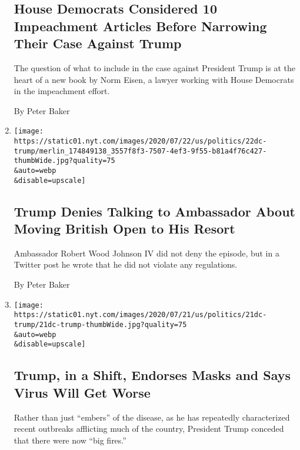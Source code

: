 \begin{enumerate}
  \hypertarget{house-democrats-considered-10-impeachment-articles-before-narrowing-their-case-against-trump}{%
  \subsection{House Democrats Considered 10 Impeachment Articles Before
  Narrowing Their Case Against
  Trump}\label{house-democrats-considered-10-impeachment-articles-before-narrowing-their-case-against-trump}}

  The question of what to include in the case against President Trump is
  at the heart of a new book by Norm Eisen, a lawyer working with House
  Democrats in the impeachment effort.

  By Peter Baker
\item
  \href{/2020/07/22/us/politics/trump-turnberry-british-open.html}{}

  \texttt{[image: https://static01.nyt.com/images/2020/07/22/us/politics/22dc-trump/merlin\_174849138\_3557f8f3-7507-4ef3-9f55-b81a4f76c427-thumbWide.jpg?quality=75\\\&auto=webp\\\&disable=upscale]}

  \hypertarget{trump-denies-talking-to-ambassador-about-moving-british-open-to-his-resort}{%
  \subsection{Trump Denies Talking to Ambassador About Moving British
  Open to His
  Resort}\label{trump-denies-talking-to-ambassador-about-moving-british-open-to-his-resort}}

  Ambassador Robert Wood Johnson IV did not deny the episode, but in a
  Twitter post he wrote that he did not violate any regulations.

  By Peter Baker
\item
  \href{/2020/07/21/us/politics/trump-coronavirus-masks.html}{}

  \texttt{[image: https://static01.nyt.com/images/2020/07/21/us/politics/21dc-trump/21dc-trump-thumbWide.jpg?quality=75\\\&auto=webp\\\&disable=upscale]}

  \hypertarget{trump-in-a-shift-endorses-masks-and-says-virus-will-get-worse}{%
  \subsection{Trump, in a Shift, Endorses Masks and Says Virus Will Get
  Worse}\label{trump-in-a-shift-endorses-masks-and-says-virus-will-get-worse}}

  Rather than just ``embers'' of the disease, as he has repeatedly
  characterized recent outbreaks afflicting much of the country,
  President Trump conceded that there were now ``big fires.''


\end{enumerate}
